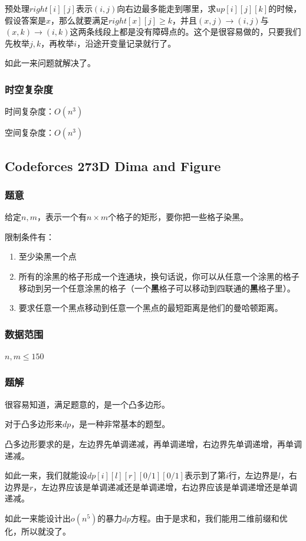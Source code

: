 \documentclass{ctexart}
\begin{document}
预处理$right[i][j]$表示$(i,j)$向右边最多能走到哪里，求$up[i][j][k]$的时候，假设答案是$x$，那么就要满足$right[x][j] \ge k$，并且$(x,j) \rightarrow (i,j)$与$(x,k) \rightarrow (i,k)$这两条线段上都是没有障碍点的。这个是很容易做的，只要我们先枚举$j,k$，再枚举$i$，沿途开变量记录就行了。

如此一来问题就解决了。
\subsubsection{时空复杂度}
时间复杂度：$O(n^3)$

空间复杂度：$O(n^3)$
\subsection{Codeforces 273D Dima and Figure}
\subsubsection{题意}
给定$n,m$，表示一个有$n \times m$个格子的矩形，要你把一些格子染黑。

限制条件有：
\begin{enumerate}
\item 至少染黑一个点
\item 所有的涂黑的格子形成一个连通块，换句话说，你可以从任意一个涂黑的格子移动到另一个任意涂黑的格子（一个\textbf{黑}格子可以移动到四联通的\textbf{黑}格子里）。
\item 要求任意一个黑点移动到任意一个黑点的最短距离是他们的曼哈顿距离。
\end{enumerate}

\subsubsection{数据范围}
$n,m \le 150$
\subsubsection{题解}
很容易知道，满足题意的，是一个凸多边形。

对于凸多边形来$dp$，是一种非常基本的题型。

凸多边形要求的是，左边界先单调递减，再单调递增，右边界先单调递增，再单调递减。

如此一来，我们就能设$dp[i][l][r][0/1][0/1]$表示到了第$i$行，左边界是$l$，右边界是$r$，左边界应该是单调递减还是单调递增，右边界应该是单调递增还是单调递减。

如此一来能设计出$o(n^5)$的暴力$dp$方程。由于是求和，我们能用二维前缀和优化，所以就没了。
\end{document}
